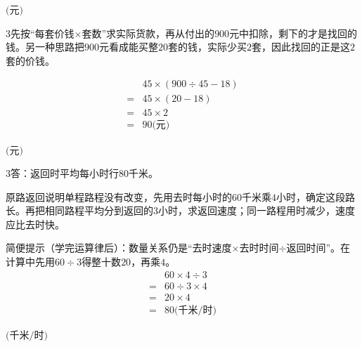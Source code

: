 \documentclass[multi=snippet,border={5bp 20bp 5bp 5bp}]{standalone}
\newenvironment{snippet}[3]{\begin{minipage}{#1bp}\color{answerred}\fontsize{#2}{#3}\selectfont\raggedright}{\end{minipage}}
\begin{document}
\begin{snippet}{80}{10.0}{14}\SourceSans\setlength{\mathindent}{2bp}\(\text{(元)}\)\end{snippet}
\begin{snippet}{505}{11.5}{14}\begin{multicols}{3}\raggedcolumns 先按“每套价钱\(\times\)\allowbreak 套数”求实际货款，再从付出的\(900\)\allowbreak 元中扣除，剩下的才是找回的钱。另一种思路把\(900\)\allowbreak 元看成能买整\(20\)\allowbreak 套的钱，实际少买\(2\)\allowbreak 套，因此找回的正是这\(2\)\allowbreak 套的价钱。\par \[\begin{aligned}&45\times(900\div45-18)\\={}&45\times(20-18)\\={}&45\times2\\={}&90\text{(元)}\end{aligned}\]\end{multicols}\end{snippet}
\begin{snippet}{80}{10.0}{14}\SourceSans\setlength{\mathindent}{2bp}\(\text{(元)}\)\end{snippet}
\begin{snippet}{505}{11.5}{14}\begin{multicols}{3}\raggedcolumns 答：返回时平均每小时行80千米。\par 原路返回说明单程路程没有改变，先用去时每小时的\(60\)\allowbreak 千米乘\(4\)\allowbreak 小时，确定这段路长。再把相同路程平均分到返回的\(3\)\allowbreak 小时，求返回速度；同一路程用时减少，速度应比去时快。\par 简便提示（学完运算律后）：数量关系仍是“去时速度\(\times\)\allowbreak 去时时间\(\div\)\allowbreak 返回时间”。在计算中先用\(60\div3\)\allowbreak 得整十数\(20\)\allowbreak ，再乘\(4\)\allowbreak 。\[\begin{aligned}&60\times4\div3\\={}&60\div3\times4\\={}&20\times4\\={}&80\text{(千米/时)}\end{aligned}\]\end{multicols}\end{snippet}
\begin{snippet}{80}{10.0}{14}\SourceSans\setlength{\mathindent}{2bp}\(\text{(千米/时)}\)\end{snippet}
\end{document}
